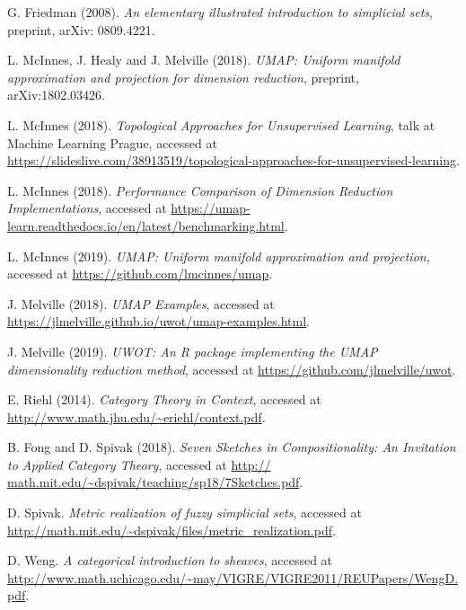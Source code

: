 \documentclass[a4paper,11pt,leqno]{article} \usepackage{amsmath}
\theoremstyle{definition}
\begin{document}
\begin{thebibliography}{99}

   G. Friedman (2008). \textit{An elementary illustrated
    introduction to simplicial sets}, preprint, arXiv: 0809.4221.

   L. McInnes, J. Healy and J. Melville (2018). \textit{UMAP:
    Uniform manifold approximation and projection for dimension reduction},
    preprint, arXiv:1802.03426.

   L. McInnes (2018). \textit{Topological Approaches for
    Unsupervised Learning}, talk at Machine Learning Prague, accessed at
    \url{https://slideslive.com/38913519/topological-approaches-for-unsupervised-learning}.

   L. McInnes (2018). \textit{Performance
    Comparison of Dimension Reduction Implementations}, accessed at
    \url{https://umap-learn.readthedocs.io/en/latest/benchmarking.html}.

   L. McInnes (2019). \textit{UMAP: Uniform manifold
    approximation and projection}, accessed at
    \url{https://github.com/lmcinnes/umap}.

   J. Melville (2018). \textit{UMAP Examples}, accessed at
    \url{https://jlmelville.github.io/uwot/umap-examples.html}.

   J. Melville (2019). \textit{UWOT: An R package
    implementing the UMAP dimensionality reduction method}, accessed at
    \url{https://github.com/jlmelville/uwot}.

   E. Riehl (2014). \textit{Category Theory in Context}, accessed
    at \url{http://www.math.jhu.edu/~eriehl/context.pdf}.

   B. Fong and D. Spivak (2018). \textit{Seven Sketches in
    Compositionality: An Invitation to Applied Category Theory}, accessed at
    \url{http:// math.mit.edu/~dspivak/teaching/sp18/7Sketches.pdf}.

   D. Spivak. \textit{Metric realization of fuzzy simplicial
    sets}, accessed at
    \url{http://math.mit.edu/~dspivak/files/metric_realization.pdf}.

   D. Weng. \textit{A categorical introduction to sheaves},
    accessed at
    \url{http://www.math.uchicago.edu/~may/VIGRE/VIGRE2011/REUPapers/WengD.pdf}.

\end{thebibliography}
\end{document}
